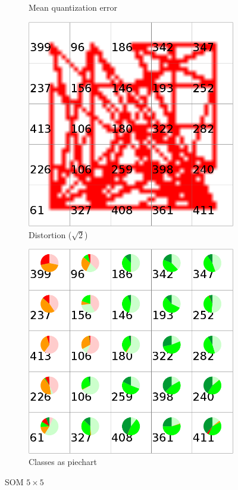 \documentclass{acm_proc_article-sp}
\begin{document}
\begin{figure}
\begin{subfigure}[b]{0.45\linewidth}
    \caption{Mean quantization error}
    \label{fig:wine-small-mean-quant-error}
\end{subfigure}
\begin{subfigure}[b]{0.45\linewidth}
    \includegraphics[width=\linewidth]{img/wine-small-dist-sqrt-2}
    \caption{Distortion ($\sqrt{2}$)}
    \label{fig:wine-small-dist-sqrt-2}
\end{subfigure}
\begin{subfigure}[b]{0.45\linewidth}
\includegraphics[width=\linewidth]{img/wine-small-pie-cls}
\caption{Classes as piechart}
\label{fig:wine-small-pie-cls}
\end{subfigure}
\caption{SOM $5\times5$}
\end{figure}
\end{document}
